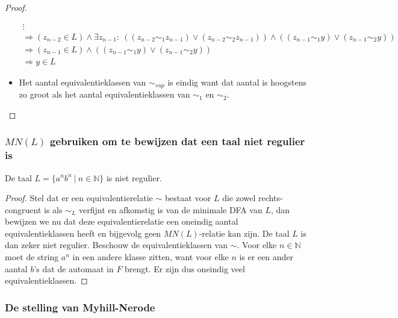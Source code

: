 \documentclass[main.tex]{subfiles}
\begin{document}
\begin{st}
\begin{proof}
\begin{itemize}
\[\begin{array}{l}
        \vdots\\
        \Rightarrow (z_{n-2} \in L) \wedge \exists z_{n-1}:\ ((z_{n-2} \sim_{1} z_{n-1}) \vee (z_{n-2} \sim_{2} z_{n-1})) \wedge ((z_{n-1} \sim_{1} y) \vee (z_{n-1} \sim_{2} y))\\
        \Rightarrow (z_{n-1} \in L) \wedge ((z_{n-1} \sim_{1} y) \vee (z_{n-1} \sim_{2} y))\\
        \Rightarrow y \in L
      \end{array}
      \]
    \item Het aantal equivalentieklassen van $\sim_{sup}$ is eindig want dat aantal is hoogstens zo groot als het aantal equivalentieklassen van $\sim_{1}$ en $\sim_{2}$.
    \end{itemize}
  \end{proof}
\end{st}

\subsubsection{$MN(L)$ gebruiken om te bewijzen dat een taal niet regulier is}
\label{sec:mnl-gebruiken-om}

\begin{st}
\label{st:an-bn-niet-regulier-mn-relatie}
  De taal $L= \{ a^{n}b^{n} \ |\ n\in \mathbb{N} \} $ is niet regulier.

  \begin{proof}
    Stel dat er een equivalentierelatie $\sim$ bestaat voor $L$ die zowel rechts-congruent is als $\sim_{L}$ verfijnt en afkomstig is van de minimale DFA van $L$, dan bewijzen we nu dat deze equivalentierelatie een oneindig aantal equivalentieklassen heeft en bijgevolg geen $MN(L)$-relatie kan zijn.
    De taal $L$ is dan zeker niet regulier.
    Beschouw de equivalentieklassen van $\sim$.
    Voor elke $n\in \mathbb{N}$ moet de string $a^{n}$ in een andere klasse zitten, want voor elke $n$ is er een ander aantal $b$'s dat de automaat in $F$ brengt.
    Er zijn dus oneindig veel equivalentieklassen.
  \end{proof}
\end{st}

\subsubsection{De stelling van Myhill-Nerode}
\label{sec:de-stelling-van}
\end{document}
